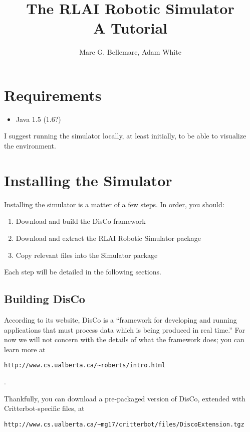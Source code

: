 \documentclass[12pt]{article}
\author{Marc G. Bellemare, Adam White}
\title{The RLAI Robotic Simulator\\ A Tutorial}
\begin{document}
\maketitle

\section{Requirements}

\begin{itemize}
\item{Java 1.5 (1.6?)}
\end{itemize}

I suggest running the simulator locally, at least initially, to be able
to visualize the environment.

\section{Installing the Simulator}

Installing the simulator is a matter of a few steps. In order, you should:

\begin{enumerate}
\item{Download and build the DisCo framework}
\item{Download and extract the RLAI Robotic Simulator package}
\item{Copy relevant files into the Simulator package}
\end{enumerate}

Each step will be detailed in the following sections.


\subsection{Building DisCo}

According to its website, DisCo is a ``framework for developing and running 
applications that must process data which is being produced in real time.'' 
For now we will not
concern with the details of what the framework does; you can learn more at
\begin{verbatim}http://www.cs.ualberta.ca/~roberts/intro.html\end{verbatim}.

Thankfully, you can download a pre-packaged version of DisCo, extended with
Critterbot-specific files, at 

\begin{verbatim}
http://www.cs.ualberta.ca/~mg17/critterbot/files/DiscoExtension.tgz
\end{verbatim}
\end{document}
